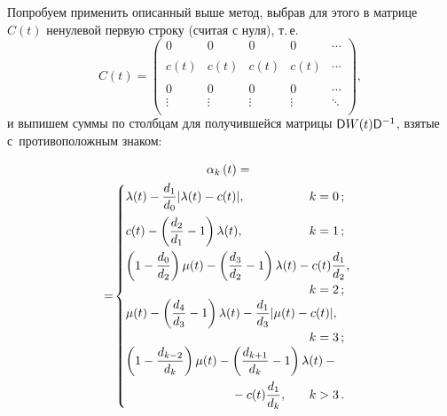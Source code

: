 \begin{multicols}{2}
Попробуем применить описанный выше метод, выбрав для этого в матрице~$C(t)$ 
ненулевой первую строку (считая с нуля), т.\,е.\
\begin{equation*}
    C(t) = \left(
    \begin{array}{ccccc}
        0 & 0 &0  & 0  & \cdots \\
        \\
        c(t) & c(t)  & c(t)  & c(t)  & \cdots \\
        \\
        0 & 0 & 0 & 0    & \cdots \\
        \vdots   & \vdots & \vdots  & \vdots    & \ddots \\
    \end{array}
    \right),
\end{equation*}
и выпишем суммы по столбцам для получившейся матрицы ${\sf D}W(t){\sf D}^{-1} $, взятые 
с~противоположным знаком:

\vspace*{-22pt}
\begin{multline}
    \alpha_{k}\left( t\right) ={}\\
 \!\!  \!{}=\!
    \begin{cases}
        \lambda(t) -\fr{d_1}{d_0} |\lambda(t) - c(t)|, &       \hspace*{-15mm}  k= 0\,;\\[9pt]
        c(t) - \left(\fr{d_2}{d_1} - 1\right) \lambda(t), & \hspace*{-15mm} k = 1\,;\\[9pt]
              \displaystyle \left(1-\fr{d_0}{d_2}\right) \mu(t) -\left(\fr{d_3}{d_2} - 
1\right) \lambda(t) - c(t) \fr{d_1}{d_2}, &\\
& \hspace*{-15mm}k = 2\,;\\
             \displaystyle  \mu(t) -\left(\fr{d_4}{d_3} - 1\right) \lambda(t) - 
\fr{d_1}{d_3}|\mu(t) - c(t)|, &\\
& \hspace*{-15mm}k = 3\,;\\
            \displaystyle  \left(1-\fr{d_{k-2}}{d_k}\right) \mu(t) -\left(\fr{d_{k+1}}{d_k} - 
1\right) \lambda(t) - {}&\\[9pt]
\hspace*{30mm}{}-c(t) \fr{d_1}{d_k}, & \hspace*{-15mm}k > 3\,.
    \end{cases}\!\!\!\!\!
 \label{t3q}
\end{multline}


\end{multicols}
